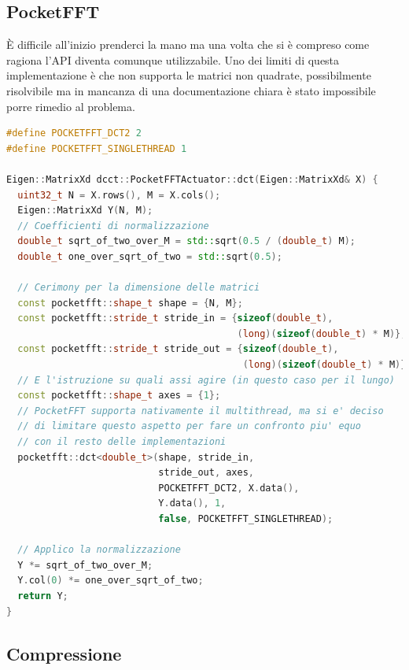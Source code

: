 \documentclass[a4paper,11pt,oneside, table]{article}
\begin{document}
\subsection{PocketFFT}

\`E difficile all'inizio prenderci la mano ma una volta che si \`e compreso come ragiona l'API diventa comunque utilizzabile.
Uno dei limiti di questa implementazione \`e che non supporta le matrici non quadrate, possibilmente risolvibile ma in mancanza di una documentazione chiara \`e stato impossibile porre rimedio al problema.

\begin{lstlisting}[language=C++]
#define POCKETFFT_DCT2 2
#define POCKETFFT_SINGLETHREAD 1

Eigen::MatrixXd dcct::PocketFFTActuator::dct(Eigen::MatrixXd& X) {
  uint32_t N = X.rows(), M = X.cols();
  Eigen::MatrixXd Y(N, M);
  // Coefficienti di normalizzazione
  double_t sqrt_of_two_over_M = std::sqrt(0.5 / (double_t) M);
  double_t one_over_sqrt_of_two = std::sqrt(0.5);

  // Cerimony per la dimensione delle matrici
  const pocketfft::shape_t shape = {N, M};
  const pocketfft::stride_t stride_in = {sizeof(double_t),
                                         (long)(sizeof(double_t) * M)};
  const pocketfft::stride_t stride_out = {sizeof(double_t),
                                          (long)(sizeof(double_t) * M)};
  // E l'istruzione su quali assi agire (in questo caso per il lungo)
  const pocketfft::shape_t axes = {1};
  // PocketFFT supporta nativamente il multithread, ma si e' deciso
  // di limitare questo aspetto per fare un confronto piu' equo
  // con il resto delle implementazioni
  pocketfft::dct<double_t>(shape, stride_in,
                           stride_out, axes,
                           POCKETFFT_DCT2, X.data(),
                           Y.data(), 1,
                           false, POCKETFFT_SINGLETHREAD);

  // Applico la normalizzazione
  Y *= sqrt_of_two_over_M;
  Y.col(0) *= one_over_sqrt_of_two;
  return Y;
}
\end{lstlisting}

\subsection{Compressione}
\end{document}
